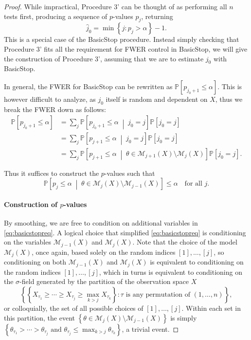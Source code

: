 \documentclass[11pt]{article}
\theoremstyle{definition}
\theoremstyle{custom}
\newcommand{\PP}{\mathbb{P}}
\begin{document}
\begin{proof}
While impractical, Procedure 3' can be thought of as performing all $n$ tests first, producing a sequence of $p$-values $p_j$, returning
\begin{equation}
\hat{j}_0 = \min\left\{j: p_j > \alpha\right\} - 1.
\label{eq:basicstop}
\end{equation}
This is a special case of the BasicStop procedure. Instead simply checking that Procedure 3' fits all the requirement for FWER control in BasicStop, we will give the construction of Procedure 3', assuming that we are to estimate $j_0$ with BasicStop.

In general, the FWER for BasicStop can be rewritten as $\PP\left[p_{j_0+1} \le \alpha\right]$. This is however difficult to analyze, as $j_0$ itself is random and dependent on $X$, thus we break the FWER down as follows:
\begin{align*}
\PP\left[p_{j_0+1} \le \alpha\right] & = \sum_j \PP\left[p_{j_0+1} \le \alpha \;\middle|\; j_0 = j\right] \PP\left[j_0 = j\right] \\
& = \sum_j \PP\left[p_{j+1} \le \alpha \;\middle|\; j_0 = j\right] \PP\left[j_0 = j\right] \\
& = \sum_j \PP\left[p_{j+1} \le \alpha \;\middle|\; \theta \in \mathcal{M}_{j+1}\left(X\right) \setminus \mathcal{M}_j\left(X\right)\right] \PP\left[j_0 = j\right].
\end{align*}

Thus it suffices to construct the $p$-values such that
\begin{equation}
\PP\left[p_j \le \alpha \;\middle|\; \theta \in \mathcal{M}_j\left(X\right) \setminus \mathcal{M}_{j-1}\left(X\right)\right] \le \alpha \quad \text{for all } j.
\label{eq:basicstopreq}
\end{equation}

\paragraph{Construction of $p$-values}

By smoothing, we are free to condition on additional variables in \eqref{eq:basicstopreq}. A logical choice that simplified \eqref{eq:basicstopreq} is conditioning on the variables $\mathcal{M}_{j-1}\left(X\right)$ and $\mathcal{M}_j\left(X\right)$. Note that the choice of the model $\mathcal{M}_j\left(X\right)$, once again, based solely on the random indices $[1], \ldots, [j]$, so conditioning on both $\mathcal{M}_{j-1}\left(X\right)$ and $\mathcal{M}_j\left(X\right)$ is equivalent to conditioning on the random indices $[1], \ldots, [j]$, which in turns is equivalent to conditioning on the $\sigma$-field generated by the partition of the observation space $X$
$$\left\{\left\{X_{\tau_1} \ge \cdots \ge X_{\tau_j} \ge \max_{k>j} X_{\tau_k}\right\}: \tau \text{ is any permutation of } \left(1, \ldots, n\right)\right\},$$
or colloquially, the set of all possible choices of $[1], \ldots, [j]$. Within each set in this partition, the event $\left\{\theta \in \mathcal{M}_j\left(X\right) \setminus \mathcal{M}_{j-1}\left(X\right)\right\}$ is simply $\left\{\theta_{\tau_1} > \cdots > \theta_{\tau_j} \text { and } \theta_{\tau_j} \le \max_{k>j} \theta_{\tau_k}\right\}$, a trivial event.


\end{proof}
\end{document}
